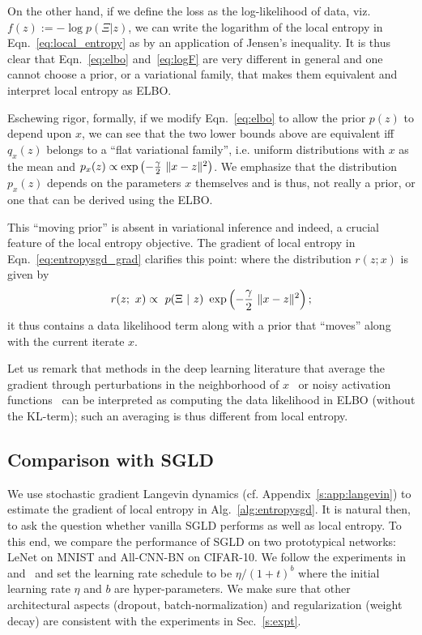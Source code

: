 \documentclass[10pt]{article}
\newcommand{\lenet}{\textrm{LeNet}}
\newcommand{\allcnn}{\textrm{All-CNN-BN}}
\begin{document}
\begin{appendices}
On the other hand, if we define the loss as the log-likelihood of data, viz. $f(z) := -\log p(\Xi | z)$, we can write the logarithm of the local entropy in Eqn.~\eqref{eq:local_entropy} as
by an application of Jensen's inequality. It is thus clear that Eqn.~\eqref{eq:elbo} and~\eqref{eq:logF} are very different in general and one cannot choose a prior, or a variational family, that makes them equivalent and interpret local entropy as ELBO.

Eschewing rigor, formally, if we modify Eqn.~\eqref{eq:elbo} to allow the prior $p(z)$ to depend upon $x$, we can see that the two lower bounds above are equivalent iff $q_x(z)$ belongs to a ``flat variational family'', i.e. uniform distributions with $x$ as the mean and $p_x(z) \propto \exp \left(-\frac{\gamma}{2}\ \lVert x-z\rVert^2\right)$. We emphasize that the distribution $p_x(z)$ depends on the parameters $x$ themselves and is thus, not really a prior, or one that can be derived using the ELBO.

This ``moving prior'' is absent in variational inference and indeed, a crucial feature of the local entropy objective. The gradient of local entropy in Eqn.~\eqref{eq:entropysgd_grad} clarifies this point:
where the distribution $r(z; x)$ is given by
$$
    r(z;\ x) \propto\ p(\Xi\ |\ z)\ \exp \rbrac{-\f{\g}{2}\ \norm{x-z}^2};
$$
it thus contains a data likelihood term along with a prior that ``moves'' along with the current iterate $x$.

Let us remark that methods in the deep learning literature that average the gradient through perturbations in the neighborhood of $x$~\citep{mobahi2016training} or noisy activation functions~\citep{gulcehre2016mollifying} can be interpreted as computing the data likelihood in ELBO (without the KL-term); such an averaging is thus different from local entropy.

\subsection{Comparison with SGLD}
\label{ss:app:comparison_sgld}

We use stochastic gradient Langevin dynamics (cf. Appendix~\ref{s:app:langevin}) to estimate the gradient of local entropy in Alg.~\ref{alg:entropysgd}. It is natural then, to ask the question whether vanilla SGLD performs as well as local entropy.
%
To this end, we compare the performance of SGLD on two prototypical networks: $\lenet$ on MNIST and $\allcnn$ on CIFAR-10. We follow the experiments in~\citet{welling2011bayesian} and~\citet{chen2015bridging} and set the learning rate schedule to be $\eta/(1 + t)^b$ where the initial learning rate $\eta$ and $b$ are hyper-parameters. We make sure that other architectural aspects (dropout, batch-normalization) and regularization (weight decay) are consistent with the experiments in Sec.~\ref{s:expt}.


\end{appendices}
\end{document}
